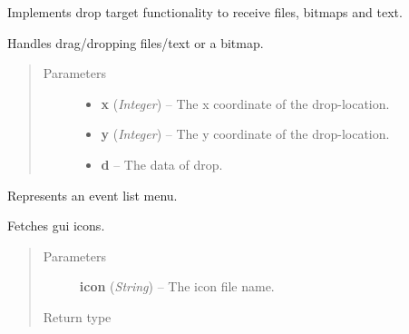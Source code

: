 \documentclass[letterpaper,10pt,english]{sphinxmanual}
\begin{document}
\begin{fulllineitems}
\label{graphicaldesign:graphicaldesign.DropTarget}
Implements drop target functionality to receive files, bitmaps and text.

\begin{fulllineitems}
\label{graphicaldesign:graphicaldesign.DropTarget.OnData}
Handles drag/dropping files/text or a bitmap.
\begin{quote}\begin{description}
\item[{Parameters}] \leavevmode\begin{itemize}
\item {} 
\textbf{x} (\emph{Integer}) -- The x coordinate of the drop-location.

\item {} 
\textbf{y} (\emph{Integer}) -- The y coordinate of the drop-location.

\item {} 
\textbf{d} -- The data of drop.

\end{itemize}

\end{description}\end{quote}

\end{fulllineitems}


\end{fulllineitems}


\begin{fulllineitems}
\label{graphicaldesign:graphicaldesign.EventListTemplate}
Represents an event list menu.

\begin{fulllineitems}
\label{graphicaldesign:graphicaldesign.EventListTemplate.GetProgramIcon}
Fetches gui icons.
\begin{quote}\begin{description}
\item[{Parameters}] \leavevmode
\textbf{icon} (\emph{String}) -- The icon file name.

\item[{Return type}] \leavevmode
{}

\end{description}\end{quote}

\end{fulllineitems}


\end{fulllineitems}
\end{document}
